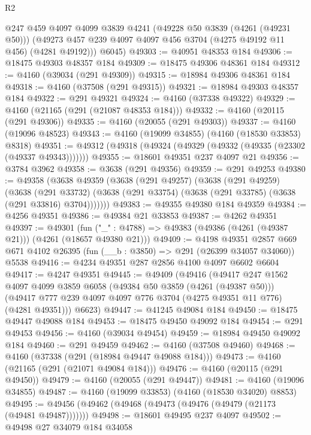 \begin{lexlean}{R2}
\begin{coremodule}
        @247
        @459
        @4097
        @4099
        @3839
        @4241
        (@49228 @50 @3839 (@4261 (@49231 @50)))
        (@49273 @457 @239 @4097 @4097 @456 @3704 (@4275 @49192 @11 @456) (@4281 @49192)))
      @6045)
@49303 := @40951 @48353 @184
@49306 := @18475 @49303 @48357 @184
@49309 := @18475 @49306 @48361 @184
@49312 := @4160 (@39034 (@291 @49309))
@49315 := @18984 @49306 @48361 @184
@49318 := @4160 (@37508 (@291 @49315))
@49321 := @18984 @49303 @48357 @184
@49322 := @291 @49321
@49324 := @4160 (@37338 @49322)
@49329 := @4160 (@21165 (@291 (@21087 @48353 @184)))
@49332 := @4160 (@20115 (@291 @49306))
@49335 := @4160 (@20055 (@291 @49303))
@49337 := @4160 (@19096 @48523)
@49343 := @4160 (@19099 @34855) (@4160 (@18530 @33853) @8318)
@49351 := @49312 (@49318 (@49324 (@49329 (@49332 (@49335 (@23302 (@49337 @49343)))))))
@49355 := @18601 @49351 @237 @4097 @21
@49356 := @3784 @3962
@49358 := @3638 (@291 @49356)
@49359 := @291 @49253
@49380 := @49358
    (@3638
      @49359
      (@3638
        (@291 @49257)
        (@3638
          (@291 @49259)
          (@3638
            (@291 @33732)
            (@3638 (@291 @33754) (@3638 (@291 @33785) (@3638 (@291 @33816) @3704)))))))
@49383 := @49355 @49380 @184 @49359
@49384 := @4256 @49351
@49386 := @49384 @21 @33853
@49387 := @4262 @49351
@49397 := @49301
    (fun ("_" : @4788) => @49383 (@49386 (@4261 (@49387 @21))) (@4261 (@18657 @49380 @21)))
@49409 := @4198
    @49351
    @2857
    @669
    @671
    @4102
    @26395
    (fun (__b : @3850) => @291 (@26399 @34057 @34060))
    @5538
@49416 := @4234 @49351 @287 @2856 @4100 @4097 @6602 @6604
@49417 := @4247 @49351
@49445 := @49409
    (@49416
      (@49417
        @247
        @1562
        @4097
        @4099
        @3859
        @6058
        (@49384 @50 @3859 (@4261 (@49387 @50)))
        (@49417 @777 @239 @4097 @4097 @776 @3704 (@4275 @49351 @11 @776) (@4281 @49351)))
      @6623)
@49447 := @41245 @49084 @184
@49450 := @18475 @49447 @49088 @184
@49453 := @18475 @49450 @49092 @184
@49454 := @291 @49453
@49456 := @4160 (@39034 @49454)
@49459 := @18984 @49450 @49092 @184
@49460 := @291 @49459
@49462 := @4160 (@37508 @49460)
@49468 := @4160 (@37338 (@291 (@18984 @49447 @49088 @184)))
@49473 := @4160 (@21165 (@291 (@21071 @49084 @184)))
@49476 := @4160 (@20115 (@291 @49450))
@49479 := @4160 (@20055 (@291 @49447))
@49481 := @4160 (@19096 @34855)
@49487 := @4160 (@19099 @33853) (@4160 (@18530 @34020) @8853)
@49495 := @49456 (@49462 (@49468 (@49473 (@49476 (@49479 (@21173 (@49481 @49487)))))))
@49498 := @18601 @49495 @237 @4097
@49502 := @49498 @27 @34079 @184 @34058

\end{coremodule}
\end{lexlean}
